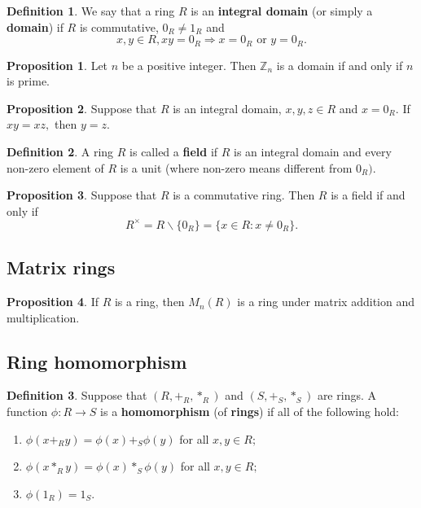 \documentclass[12pt, a4paper]{article}
\newcommand{\bb}[1]{\mathbb{#1}}
\newcommand{\imply}{\Rightarrow}
\theoremstyle{definition}
\newtheorem{definition}{Definition}[section]
\newtheorem{proposition}{Proposition}
\theoremstyle{plain}
\begin{document}
\begin{definition}
We say that a ring $R$ is an \textbf{integral domain} (or simply a \textbf{domain}) if $R$ is commutative, $0_R \neq 1_R$ and 
$$x,y \in R, xy=0_R \imply x=0_R \text{ or } y=0_R.$$
\end{definition}
	
\begin{proposition}
Let $n$ be a positive integer. Then $\bb{Z}_n$ is a domain if and only if $n$ is prime.
\end{proposition}

\begin{proposition}
Suppose that $R$ is an integral domain, $x,y,z \in R$ and $x=0_R.$ If $xy=xz,$ then $y=z.$
\end{proposition}

\begin{definition}
A ring $R$ is called a \textbf{field} if $R$ is an integral domain and every non-zero element of $R$ is a unit (where non-zero means different from $0_R).$
\end{definition}

\begin{proposition}
Suppose that $R$ is a commutative ring. Then $R$ is a field if and only if 
$$R^{\times}=R\backslash \{0_R\}=\{x\in R : x\neq 0_R\}.$$
\end{proposition}

\subsection{Matrix rings}

\begin{proposition}
If $R$ is a ring, then $M_n(R)$ is a ring under matrix addition and multiplication.
\end{proposition}

\subsection{Ring homomorphism}

\begin{definition}
Suppose that $(R,+_R,*_R)$ and $(S,+_S,*_S)$ are rings. A function $\phi : R \to S$ is a \textbf{homomorphism} (of \textbf{rings}) if all of the following hold:
\begin{enumerate}
	
	\item $\phi(x +_R y)=\phi(x) +_S \phi(y)$ for all $x,y \in R;$

	\item $\phi(x *_R y)=\phi(x) *_S \phi(y)$ for all $x,y \in R;$

	\item $\phi(1_R)=1_S.$

\end{enumerate}
\end{definition}
	
\end{document}
